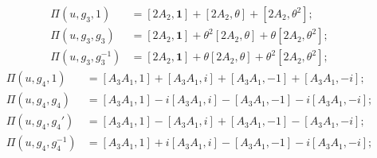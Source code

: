 \begin{align*}
    \Pi(u, g_3, 1) &= [2A_2,\mathbf{1}] + [2A_2,\theta] + [2A_2,\theta^2]; \\
    \Pi(u, g_3, g_3) &= [2A_2,\mathbf{1}] + \theta^2[2A_2,\theta] + \theta[2A_2,\theta^2]; \\
    \Pi(u, g_3, g_3^{-1}) &= [2A_2,\mathbf{1}] + \theta[2A_2,\theta] + \theta^2[2A_2,\theta^2];
\end{align*}
\begin{align*}
    \Pi(u, g_4, 1) &= [A_3A_1,1] + [A_3A_1,i] + [A_3A_1,-1] + [A_3A_1,-i]; \\
    \Pi(u, g_4, g_4) &= [A_3A_1,1] - i[A_3A_1,i] - [A_3A_1,-1] - i[A_3A_1,-i]; \\
    \Pi(u, g_4, g_4') &= [A_3A_1,1] - [A_3A_1,i] + [A_3A_1,-1] - [A_3A_1,-i]; \\
    \Pi(u, g_4, g_4^{-1}) &= [A_3A_1,1] + i[A_3A_1,i] - [A_3A_1,-1] - i[A_3A_1,-i];
\end{align*}




